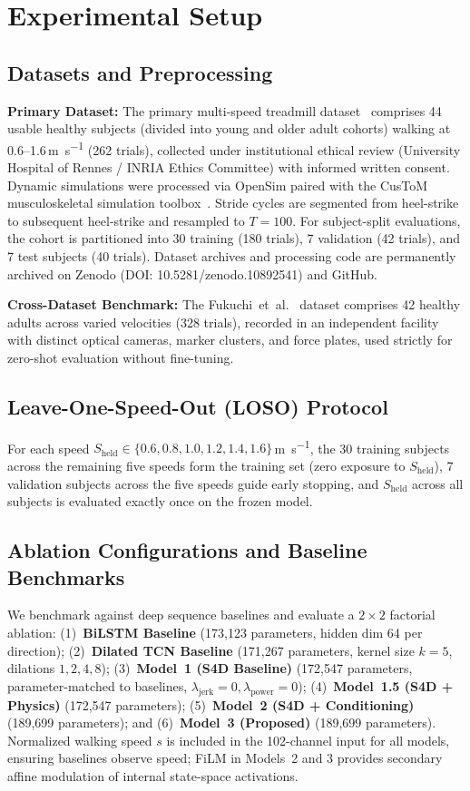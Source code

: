 \documentclass[journal]{IEEEtran}
\newcommand{\lamjerk}{\lambda_{\mathrm{jerk}}}
\newcommand{\lampower}{\lambda_{\mathrm{power}}}
\begin{document}
\section{Experimental Setup}

\subsection{Datasets and Preprocessing}
\label{sec:datasets}
\textbf{Primary Dataset:} The primary multi-speed treadmill dataset~\cite{legoff2026sixspeed} comprises 44 usable healthy subjects (divided into young and older adult cohorts) walking at 0.6--1.6\,\si{\metre\per\second} (262 trials), collected under institutional ethical review (University Hospital of Rennes / INRIA Ethics Committee) with informed written consent. Dynamic simulations were processed via OpenSim paired with the CusToM musculoskeletal simulation toolbox~\cite{muller2019custom}. Stride cycles are segmented from heel-strike to subsequent heel-strike and resampled to $T=100$. For subject-split evaluations, the cohort is partitioned into 30 training (180 trials), 7 validation (42 trials), and 7 test subjects (40 trials). Dataset archives and processing code are permanently archived on Zenodo (DOI: 10.5281/zenodo.10892541) and GitHub.

\textbf{Cross-Dataset Benchmark:} The Fukuchi~et~al.~\cite{fukuchi2018public} dataset comprises 42 healthy adults across varied velocities (328 trials), recorded in an independent facility with distinct optical cameras, marker clusters, and force plates, used strictly for zero-shot evaluation without fine-tuning.

\subsection{Leave-One-Speed-Out (LOSO) Protocol}
For each speed $S_{\mathrm{held}} \in \{0.6, 0.8, 1.0, 1.2, 1.4, 1.6\}$\,\si{\metre\per\second}, the 30 training subjects across the remaining five speeds form the training set (zero exposure to $S_{\mathrm{held}}$), 7 validation subjects across the five speeds guide early stopping, and $S_{\mathrm{held}}$ across all subjects is evaluated exactly once on the frozen model.

\subsection{Ablation Configurations and Baseline Benchmarks}
We benchmark against deep sequence baselines and evaluate a $2 \times 2$ factorial ablation: (1)~\textbf{BiLSTM Baseline} (173,123 parameters, hidden dim 64 per direction); (2)~\textbf{Dilated TCN Baseline} (171,267 parameters, kernel size $k=5$, dilations $1, 2, 4, 8$); (3)~\textbf{Model~1 (S4D Baseline)} (172,547 parameters, parameter-matched to baselines, $\lamjerk = 0, \lampower = 0$); (4)~\textbf{Model~1.5 (S4D + Physics)} (172,547 parameters); (5)~\textbf{Model~2 (S4D + Conditioning)} (189,699 parameters); and (6)~\textbf{Model~3 (Proposed)} (189,699 parameters). Normalized walking speed $s$ is included in the 102-channel input for all models, ensuring baselines observe speed; FiLM in Models~2 and 3 provides secondary affine modulation of internal state-space activations.
\end{document}
